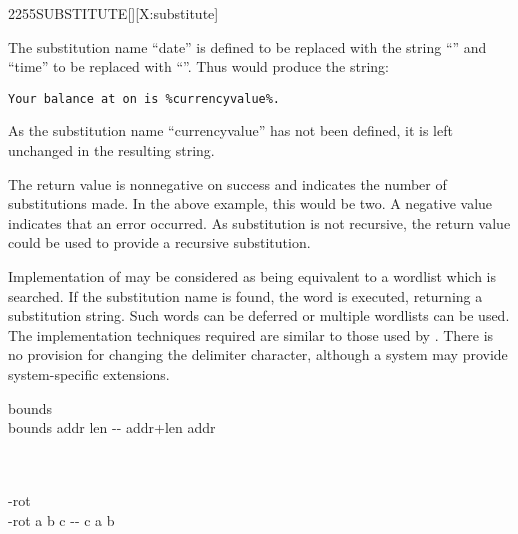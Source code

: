 \begin{worddef}{2255}{SUBSTITUTE}[][X:substitute]
\begin{rationale}
		The substitution name ``date'' is defined to be replaced with the string
		``\pdate'' and ``time'' to be replaced with ``\ptime''.  Thus
		 would produce the string:

		\begin{center}
			\texttt{Your balance at \ptime{} on \pdate{} is \%currencyvalue\%.}
		\end{center}

		As the substitution name ``currencyvalue'' has not been defined, it is
		left unchanged in the resulting string.

		The return value  is nonnegative on success and indicates the
		number of substitutions made.  In the above example, this would be two.
		A negative value indicates that an error occurred.
		As substitution is not recursive, the return value could be used to
		provide a recursive substitution.

		Implementation of  may be considered as being equivalent
		to a wordlist which is searched.  If the substitution name is found, the
		word is executed, returning a substitution string.
		Such words can be deferred or multiple wordlists can be used.
		The implementation techniques required are similar to those used by
		.
		There is no provision for changing the delimiter character, although a
		system may provide system-specific extensions.
	\end{rationale}

	\begin{implement}

		\word[tools]{[UNDEFINED]} bounds \word[tools]{[IF]} \\
		\tab \word{:} bounds \tab {} addr len -{}- addr+len addr \\
		\tab[2]  \word{+} \\
		\tab \word{;} \\
		\word[tools]{[THEN]}

		\word[tools]{[UNDEFINED]} -rot \word[tools]{[IF]} \\
		\tab \word{:} -rot \tab {} a b c -{}- c a b \\
		\tab[2] \word{ROT}  \\
		\tab \word{;} \\
		\word[tools]{[THEN]}


\end{implement}
\end{worddef}
